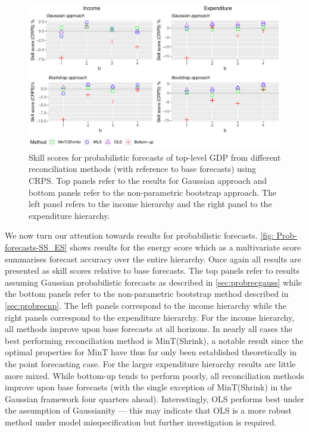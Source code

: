 \documentclass[a4paper, 11pt]{article}
\begin{document}
\begin{figure}
	\centering
	\small
	\includegraphics[width=\textwidth]{Figs/Results/ProbF_UnivS.pdf}
	\caption{Skill scores for probabilistic forecasts of top-level GDP from different reconciliation methods (with reference to base forecasts) using CRPS. Top panels refer to the results for Gaussian approach and bottom panels refer to the non-parametric bootstrap approach. The left panel refers to the income hierarchy and the right panel to the expenditure hierarchy.}
	\label{fig: Prob-forecasts-SS_CRPS}
\end{figure}

We now turn our attention towards results for probabilistic forecasts. \autoref{fig: Prob-forecasts-SS_ES} shows results for the energy score which as a multivariate score summarises forecast accuracy over the entire hierarchy. Once again all results are presented as skill scores relative to base forecasts. The top panels refer to results assuming Gaussian probabilistic forecasts as described in \autoref{sec:probrecgauss} while the bottom panels refer to the non-parametric bootstrap method described in \autoref{sec:probrecnp}. The left panels correspond to the income hierarchy while the right panels correspond to the expenditure hierarchy. For the income hierarchy, all methods improve upon base forecasts at all horizons. In nearly all cases the best performing reconciliation method is MinT(Shrink), a notable result since the optimal properties for MinT have thus far only been established theoretically in the point forecasting case. For the larger expenditure hierarchy results are little more mixed. While bottom-up tends to perform poorly, all reconciliation methods improve upon base forecasts (with the single exception of MinT(Shrink) in the Gaussian framework four quarters ahead). Interestingly, OLS performs best under the assumption of Gaussianity --- this may indicate that OLS is a more robust method under model misspecification but further investigation is required.
\end{document}
